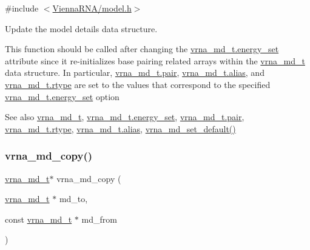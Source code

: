 {\ttfamily \#include $<$\hyperlink{model_8h}{Vienna\+R\+N\+A/model.\+h}$>$}



Update the model details data structure. 

This function should be called after changing the \hyperlink{group__model__details_a5eee4e3b468eb690d1407e0178dafb3f}{vrna\+\_\+md\+\_\+t.\+energy\+\_\+set} attribute since it re-\/initializes base pairing related arrays within the \hyperlink{group__model__details_ga1f8a10e12a0a1915f2a4eff0b28ea17c}{vrna\+\_\+md\+\_\+t} data structure. In particular, \hyperlink{group__model__details_ab4da594c638707e212f64aadb54a7454}{vrna\+\_\+md\+\_\+t.\+pair}, \hyperlink{group__model__details_a66136cf9abc8ff790ec0d33245d68fd5}{vrna\+\_\+md\+\_\+t.\+alias}, and \hyperlink{group__model__details_ad082d0fea31e002b90cdfe5e6382f8b0}{vrna\+\_\+md\+\_\+t.\+rtype} are set to the values that correspond to the specified \hyperlink{group__model__details_a5eee4e3b468eb690d1407e0178dafb3f}{vrna\+\_\+md\+\_\+t.\+energy\+\_\+set} option

\begin{DoxySeeAlso}{See also}
\hyperlink{group__model__details_ga1f8a10e12a0a1915f2a4eff0b28ea17c}{vrna\+\_\+md\+\_\+t}, \hyperlink{group__model__details_a5eee4e3b468eb690d1407e0178dafb3f}{vrna\+\_\+md\+\_\+t.\+energy\+\_\+set}, \hyperlink{group__model__details_ab4da594c638707e212f64aadb54a7454}{vrna\+\_\+md\+\_\+t.\+pair}, \hyperlink{group__model__details_ad082d0fea31e002b90cdfe5e6382f8b0}{vrna\+\_\+md\+\_\+t.\+rtype}, \hyperlink{group__model__details_a66136cf9abc8ff790ec0d33245d68fd5}{vrna\+\_\+md\+\_\+t.\+alias}, \hyperlink{group__model__details_ga8ac6ff84936282436f822644bf841f66}{vrna\+\_\+md\+\_\+set\+\_\+default()} 
\end{DoxySeeAlso}
\mbox{\label{group__model__details_ga619057a740918b5fb01808362bb67aea}} 
\subsubsection{\texorpdfstring{vrna\+\_\+md\+\_\+copy()}{vrna\_md\_copy()}}
{\footnotesize\ttfamily \hyperlink{group__model__details_ga1f8a10e12a0a1915f2a4eff0b28ea17c}{vrna\+\_\+md\+\_\+t}$\ast$ vrna\+\_\+md\+\_\+copy (\begin{DoxyParamCaption}\item[{\hyperlink{group__model__details_ga1f8a10e12a0a1915f2a4eff0b28ea17c}{vrna\+\_\+md\+\_\+t} $\ast$}]{md\+\_\+to,  }\item[{const \hyperlink{group__model__details_ga1f8a10e12a0a1915f2a4eff0b28ea17c}{vrna\+\_\+md\+\_\+t} $\ast$}]{md\+\_\+from }\end{DoxyParamCaption})}



